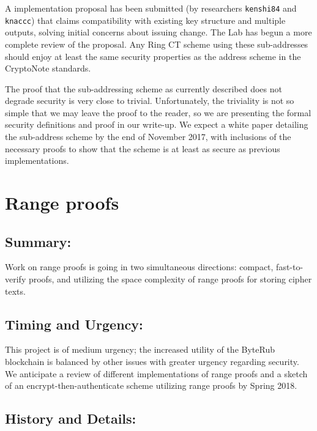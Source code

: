 \documentclass[12pt,english]{mrl}
\theoremstyle{definition}
\numberwithin{equation}{section}
\numberwithin{figure}{section}
\numberwithin{equation}{section}
\numberwithin{equation}{section}
\numberwithin{figure}{section}
\begin{document}
A implementation proposal has been submitted (by researchers \texttt{kenshi84} and \texttt{knaccc}) that claims compatibility with existing key structure and multiple outputs, solving initial concerns about issuing change. The Lab has begun a more complete review of the proposal. Any Ring CT scheme using these sub-addresses should enjoy at least the same security properties as the address scheme in the CryptoNote standards. 

The proof that the sub-addressing scheme as currently described does not degrade security is very close to trivial. Unfortunately, the triviality is not so simple that we may leave the proof to the reader, so we are presenting the formal security definitions and proof in our write-up. We expect a white paper detailing the sub-address scheme by the end of November 2017, with inclusions of the necessary proofs to show that the scheme is at least as secure as previous implementations.





\section{Range proofs} 

\subsection{Summary:} 

Work on range proofs is going in two simultaneous directions: compact, fast-to-verify proofs, and utilizing the space complexity of range proofs for storing cipher texts.

\subsection{Timing and Urgency:} 

This project is of medium urgency; the increased utility of the ByteRub blockchain is balanced by other issues with greater urgency regarding security. We anticipate a review of different implementations of range proofs and a sketch of an encrypt-then-authenticate scheme utilizing range proofs by Spring 2018.

\subsection{History and Details:} 
\end{document}
